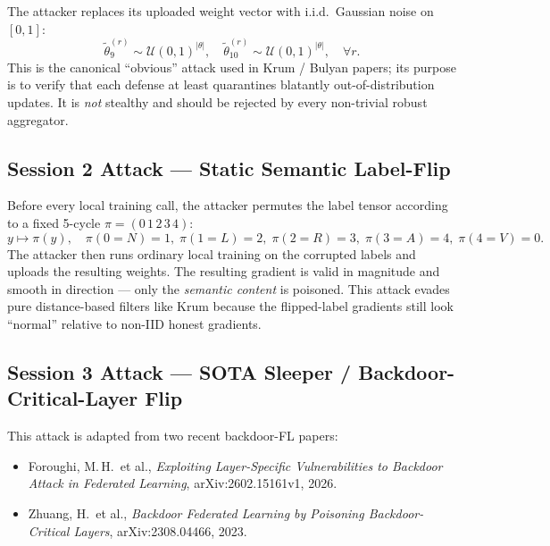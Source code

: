 \documentclass[11pt,a4paper]{article}
\begin{document}
The attacker replaces its uploaded weight vector with
i.i.d.\ Gaussian noise on $[0,1]$:
\begin{equation}
\tilde{\theta}_{9}^{(r)} \sim \mathcal{U}(0,1)^{|\theta|},\quad
\tilde{\theta}_{10}^{(r)} \sim \mathcal{U}(0,1)^{|\theta|},\quad \forall r.
\label{eq:gauss}
\end{equation}
This is the canonical ``obvious'' attack used in Krum / Bulyan papers;
its purpose is to verify that each defense at least quarantines blatantly
out-of-distribution updates. It is \textit{not} stealthy and should be
rejected by every non-trivial robust aggregator.

\subsection{Session 2 Attack --- Static Semantic Label-Flip}

Before every local training call, the attacker permutes the label
tensor according to a fixed 5-cycle $\pi = (0\,1\,2\,3\,4)$:
\begin{equation}
y \longmapsto \pi(y),\quad
\pi(0{=}N)\!=\!1,\;
\pi(1{=}L)\!=\!2,\;
\pi(2{=}R)\!=\!3,\;
\pi(3{=}A)\!=\!4,\;
\pi(4{=}V)\!=\!0.
\label{eq:flip}
\end{equation}
The attacker then runs ordinary local training on the corrupted labels
and uploads the resulting weights. The resulting gradient is valid in
magnitude and smooth in direction --- only the \textit{semantic content} is
poisoned. This attack evades pure distance-based filters like Krum
because the flipped-label gradients still look ``normal'' relative to
non-IID honest gradients.

\subsection{Session 3 Attack --- SOTA Sleeper / Backdoor-Critical-Layer Flip}
\label{sec:sleeper}

This attack is adapted from two recent backdoor-FL papers:

\begin{itemize}[nosep]
    \item Foroughi, M.\,H.\ et al., \emph{Exploiting Layer-Specific
          Vulnerabilities to Backdoor Attack in Federated Learning},
          arXiv:2602.15161v1, 2026.
    \item Zhuang, H.\ et al., \emph{Backdoor Federated Learning by
          Poisoning Backdoor-Critical Layers}, arXiv:2308.04466, 2023.
\end{itemize}
\end{document}
